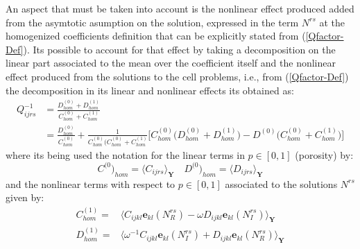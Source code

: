 An aspect that must be taken into account is the nonlinear effect produced added from the asymtotic asumption on the solution, expressed in the term $N^{rs}$ at the homogenized coefficients definition that can be explicitly stated from (\ref{Qfactor-Def}).
Its possible to account for that effect by taking a decomposition on the linear part associated to the mean over the coefficient itself and the nonlinear effect produced from the solutions to the cell problems, i.e., from (\ref{Qfactor-Def}) the decomposition in its linear and nonlinear effects its obtained as:
\begin{equation}
    \label{Expansion-Qfactor}
    \begin{array}{cc}
        Q_{ijrs}^{-1}  & = \frac{D_{hom}^{(0)} + D_{hom}^{(1)}}{C_{hom}^{(0)} + C_{hom}^{(1)}}  \\
         & =  \frac{D_{hom}^{(0)}}{C_{hom}^{(0)}} + \frac{1}{C^{(0)}_{hom}( C^{(0)}_{hom} + C^{(1)}_{hom}} \big[C^{(0)}_{hom} \big( D^{(0)}_{hom} + D^{(1)}_{hom}\big) - D^{(0)}\big( C^{(0)}_{hom} + C^{(1)}_{hom} \big) \big]
    \end{array}
\end{equation}
where its being used the notation for the linear terms in $p \in [0,1]$ (porosity) by:
\begin{equation*}
    C^{(0})_{hom} = \langle C_{ijrs} \rangle_{\mathbf{Y}} \quad  D^{(0})_{hom} = \langle D_{ijrs} \rangle_{\mathbf{Y}}
\end{equation*}
and the nonlinear terms with respect to $p \in [0,1]$ associated to the solutions $N^{rs}$ given by:
\begin{equation*}
    \begin{array}{cc}
        C^{(1)}_{hom} =& \langle C_{ijkl}\mathbf{e}_{kl}(N^{rs}_R) - \omega D_{ijkl}\mathbf{e}_{kl}(N^{rs}_I) \rangle_{\mathbf{Y}} \\
        D^{(1)}_{hom} =& \langle \omega^{-1} C_{ijkl}\mathbf{e}_{kl}(N^{rs}_I) + D_{ijkl}\mathbf{e}_{kl}(N^{rs}_R) \rangle_{\mathbf{Y}} 
    \end{array}
\end{equation*}

